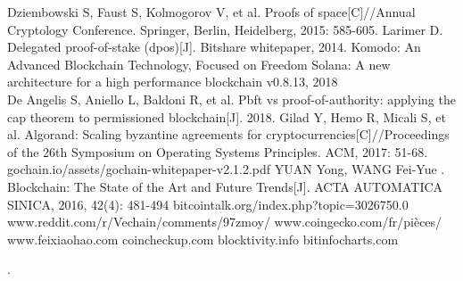 \documentclass[]{article}
\begin{document}
\begin{CJK*}{UTF8}{gbsn}
\begin{thebibliography}{99}
 Dziembowski S, Faust S, Kolmogorov V, et al. Proofs of space[C]//Annual Cryptology Conference. Springer, Berlin, Heidelberg, 2015: 585-605.
 Larimer D. Delegated proof-of-stake (dpos)[J]. Bitshare whitepaper, 2014.
 Komodo: An Advanced Blockchain Technology, Focused on Freedom
 Solana: A new architecture for a high
performance blockchain v0.8.13, 2018\\
 De Angelis S, Aniello L, Baldoni R, et al. Pbft vs proof-of-authority: applying the cap theorem to permissioned blockchain[J]. 2018.
 Gilad Y, Hemo R, Micali S, et al. Algorand: Scaling byzantine agreements for cryptocurrencies[C]//Proceedings of the 26th Symposium on Operating Systems Principles. ACM, 2017: 51-68.
 gochain.io/assets/gochain-whitepaper-v2.1.2.pdf
 YUAN Yong, WANG Fei-Yue	. Blockchain: The State of the Art and Future Trends[J]. ACTA AUTOMATICA SINICA, 2016, 42(4): 481-494
  bitcointalk.org/index.php?topic=3026750.0
www.reddit.com/r/Vechain/comments/97zmoy/
www.coingecko.com/fr/pièces/
www.feixiaohao.com
coincheckup.com
blocktivity.info
bitinfocharts.com
	\end{thebibliography}
	.
\end{CJK*}
\end{document}

